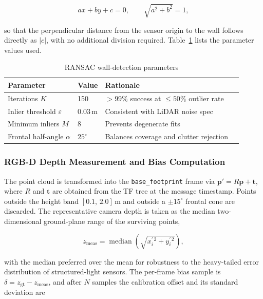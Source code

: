 \begin{equation}
    ax + by + c = 0, \qquad \sqrt{a^{2}+b^{2}} = 1,
    \label{eq:line}
\end{equation}

so that the perpendicular distance from the sensor origin to the wall
follows directly as $|c|$, with no additional division required.
Table~\ref{tab:ransac} lists the parameter values used.

\begin{table}[H]
\centering
\caption{RANSAC wall-detection parameters}
\label{tab:ransac}
\begin{tabular}{llll}
\hline
\textbf{Parameter} & \textbf{Value} & \textbf{Rationale} \\
\hline
Iterations $K$          & 150     & ${>}99\%$ success at ${\leq}50\%$ outlier rate \\
Inlier threshold $\varepsilon$ & 0.03\,m & Consistent with LiDAR noise spec \\
Minimum inliers $M$     & 8       & Prevents degenerate fits \\
Frontal half-angle $\alpha$ & $25^{\circ}$ & Balances coverage and clutter rejection \\
\hline
\end{tabular}
\end{table}

\subsubsection{RGB-D Depth Measurement and Bias Computation}

The point cloud is transformed into the \texttt{base\_footprint} frame
via $\mathbf{p}' = R\mathbf{p} + \mathbf{t}$, where $R$ and
$\mathbf{t}$ are obtained from the TF tree at the message timestamp.
Points outside the height band $[0.1,\,2.0]$\,m and outside a
$\pm 15^{\circ}$ frontal cone are discarded. The representative camera
depth is taken as the median two-dimensional ground-plane range of the
surviving points,

\begin{equation}
    z_{\text{meas}} = \operatorname{median}
        \!\left(\sqrt{x_{i}^{\prime\,2} + y_{i}^{\prime\,2}}\right),
    \label{eq:zmeas}
\end{equation}

with the median preferred over the mean for robustness to the
heavy-tailed error distribution of structured-light sensors. The
per-frame bias sample is $\delta = z_{\text{gt}} - z_{\text{meas}}$,
and after $N$ samples the calibration offset and its standard deviation
are

